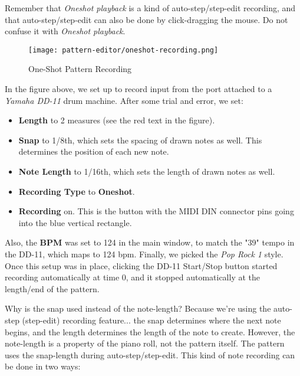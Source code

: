 \begin{itemize}
   Remember that \textsl{Oneshot playback} is a kind of auto-step/step-edit
   recording, and that auto-step/step-edit can also be done by click-dragging
   the mouse.  Do not confuse it with \textsl{Oneshot playback}.

\begin{figure}[H]
   \centering 
   \texttt{[image: pattern-editor/oneshot-recording.png]}
   \caption{One-Shot Pattern Recording}
   \label{fig:pattern_editor_oneshot_recording}
\end{figure}

   In the figure above, we set up to record input from the port attached to a
   \textsl{Yamaha DD-11} drum machine.  After some trial and error,
   we set:

   \begin{itemize}
      \item \textbf{Length} to 2 measures (see the red text in the figure).
      \item \textbf{Snap} to 1/8th, which sets the spacing of drawn notes as
         well.  This determines the position of each new note.
      \item \textbf{Note Length} to 1/16th, which sets the length of drawn
         notes as well.
      \item \textbf{Recording Type} to \textbf{Oneshot}.
      \item \textbf{Recording} on. This is the button with the MIDI DIN
         connector pins going into the blue vertical rectangle.
   \end{itemize}

   Also, the \textbf{BPM} was set to 124 in the main
   window, to match the "39" tempo in the DD-11, which maps to 124 bpm.
   Finally, we picked the \textsl{Pop Rock 1} style.  
   Once this setup was in place, clicking the DD-11 Start/Stop button started
   recording automatically at time 0, and it stopped automatically at the
   length/end of the pattern.

   Why is the snap used instead of the note-length?  Because we're using the
   auto-step (step-edit) recording feature...
   the snap determines where the next note
   begins, and the length determines the length of the note to create.
   However, the note-length is a property of the piano roll, not the pattern
   itself.  The pattern uses the snap-length during auto-step/step-edit.
   This kind of note recording can be done in two ways:


\end{itemize}
